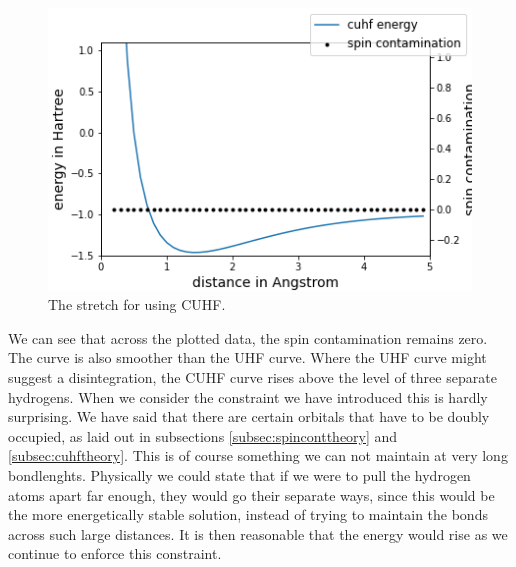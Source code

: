 \documentclass[twoside,twocolumn,9pt]{article}
\begin{document}
\begin{center}
  \begin{figure}[h]
    \includegraphics[width=\linewidth]{./../notes/figures/h3_cuhf.png}
    \caption{The stretch for  using CUHF.}
    \label{fig:cuhf_h3}
  \end{figure}
\end{center}
We can see that across the plotted data, the spin contamination remains zero. The curve is also smoother than the UHF curve. Where
the UHF curve might suggest a disintegration, the CUHF curve rises above the level of three separate hydrogens. When we consider the constraint we have introduced this is hardly
surprising. We have said that there are certain orbitals that have to be doubly occupied, as laid out in subsections \ref{subsec:spinconttheory} and \ref{subsec:cuhftheory}.
This is of course something we can not maintain at very long bondlenghts. Physically we could state that if we were to pull the hydrogen atoms apart far enough, they would go
their separate ways, since this would be the more energetically stable solution, instead of trying to maintain the bonds across such large distances. It is then reasonable that
the energy would rise as we continue to enforce this constraint.
\end{document}

